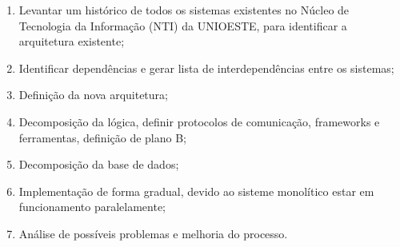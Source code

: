\documentclass[12pt]{article}
\begin{document}
\begin{enumerate}
	\item Levantar um histórico de todos os sistemas existentes no Núcleo de Tecnologia da Informação (NTI) da UNIOESTE, para identificar a arquitetura existente;
	\item Identificar dependências e gerar lista de interdependências entre os sistemas;
	\item Definição da nova arquitetura;
	\item Decomposição da lógica, definir protocolos de comunicação, frameworks e ferramentas, definição de plano B;
	\item Decomposição da base de dados;
	\item Implementação de forma gradual, devido ao sisteme monolítico estar em funcionamento paralelamente;
	\item Análise de possíveis problemas e melhoria do processo.
	
\end{enumerate}





\end{document}
